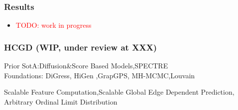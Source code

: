 \documentclass[./presentation.tex]{subfiles}
\begin{document}
\begin{frame}[label=working]
  \frametitle{Results}
  \begin{itemize}
    \item \textcolor{red}{TODO: work in progress}
  \end{itemize}
\end{frame}

\begin{frame}[t]
  \frametitle{HCGD (WIP, under review at XXX)}
  \vspace{-1cm}
  \begin{priorart}
    Prior SotA:Diffusion\&Score Based Models\cite{niuPermutationInvariantGraph2020b,songGenerativeModelingEstimating2019b},SPECTRE\cite{martinkusSPECTRESpectralConditioning2022b}\\
   Foundations: DiGress\cite{krawczukGGGANGeometricGraph2020}, HiGen \cite{karami},GrapGPS, MH-MCMC,Louvain
  \end{priorart}
  \begin{contributions}
    Scalable Feature Computation,Scalable Global Edge Dependent Prediction, Arbitrary Ordinal Limit Distribution
  \end{contributions}
\end{frame}
\end{document}
